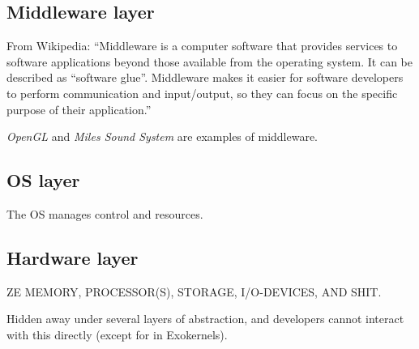 \documentclass{article}
\begin{document}
\subsection*{Middleware layer}
From Wikipedia: ``Middleware is a computer software that provides services to software applications beyond those available from the operating system. It can be described as ``software glue''. Middleware makes it easier for software developers to perform communication and input/output, so they can focus on the specific purpose of their application.''

\emph{OpenGL} and \emph{Miles Sound System} are examples of middleware.

\subsection*{OS layer}
The OS manages control and resources.

\subsection*{Hardware layer}
ZE MEMORY, PROCESSOR(S), STORAGE, I/O-DEVICES, AND SHIT.

Hidden away under several layers of abstraction, and developers cannot interact with this directly (except for in Exokernels).
\end{document}
